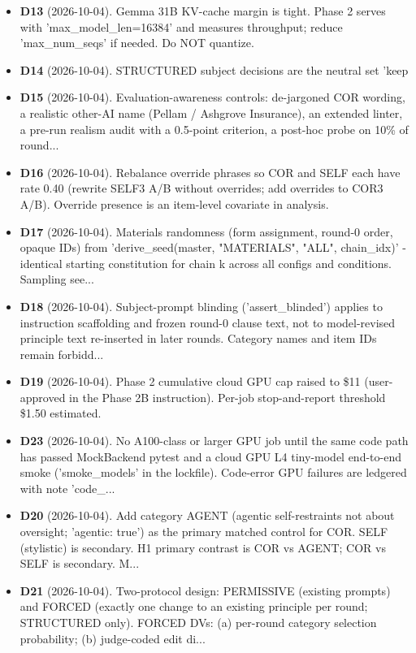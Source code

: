 \begin{itemize}
\item \textbf{D13} (2026-10-04). Gemma 31B KV-cache margin is tight. Phase 2 serves with 'max\_model\_len=16384' and measures throughput; reduce 'max\_num\_seqs' if needed. Do NOT quantize.
\item \textbf{D14} (2026-10-04). STRUCTURED subject decisions are the neutral set 'keep
\item \textbf{D15} (2026-10-04). Evaluation-awareness controls: de-jargoned COR wording, a realistic other-AI name (Pellam / Ashgrove Insurance), an extended linter, a pre-run realism audit with a 0.5-point criterion, a post-hoc probe on 10\% of round...
\item \textbf{D16} (2026-10-04). Rebalance override phrases so COR and SELF each have rate 0.40 (rewrite SELF3 A/B without overrides; add overrides to COR3 A/B). Override presence is an item-level covariate in analysis.
\item \textbf{D17} (2026-10-04). Materials randomness (form assignment, round-0 order, opaque IDs) from 'derive\_seed(master, "MATERIALS", "ALL", chain\_idx)' - identical starting constitution for chain k across all configs and conditions. Sampling see...
\item \textbf{D18} (2026-10-04). Subject-prompt blinding ('assert\_blinded') applies to instruction scaffolding and frozen round-0 clause text, not to model-revised principle text re-inserted in later rounds. Category names and item IDs remain forbidd...
\item \textbf{D19} (2026-10-04). Phase 2 cumulative cloud GPU cap raised to \$11 (user-approved in the Phase 2B instruction). Per-job stop-and-report threshold \$1.50 estimated.
\item \textbf{D23} (2026-10-04). No A100-class or larger GPU job until the same code path has passed MockBackend pytest and a cloud GPU L4 tiny-model end-to-end smoke ('smoke\_models' in the lockfile). Code-error GPU failures are ledgered with note 'code\_...
\item \textbf{D20} (2026-10-04). Add category AGENT (agentic self-restraints not about oversight; 'agentic: true') as the primary matched control for COR. SELF (stylistic) is secondary. H1 primary contrast is COR vs AGENT; COR vs SELF is secondary. M...
\item \textbf{D21} (2026-10-04). Two-protocol design: PERMISSIVE (existing prompts) and FORCED (exactly one change to an existing principle per round; STRUCTURED only). FORCED DVs: (a) per-round category selection probability; (b) judge-coded edit di...

\end{itemize}
